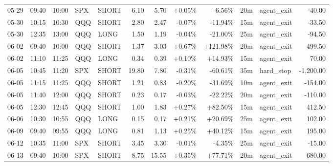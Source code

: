 \documentclass[11pt,a4paper]{article}
\begin{document}
\begin{center}
\begin{longtable}{>{\color{txtmain}}l l l l l r r r r r >{\color{txtmain}}l r}
05-29 & 09:40 & 10:00 & SPX & SHORT & 6.10 & 5.70 & \textcolor{wingreen}{+0.05\%} & \textcolor{lossred}{-6.56\%} & 20m & agent\_exit & \textcolor{lossred}{-40.00} \\
05-30 & 10:15 & 10:30 & QQQ & SHORT & 2.80 & 2.47 & \textcolor{lossred}{-0.07\%} & \textcolor{lossred}{-11.94\%} & 15m & agent\_exit & \textcolor{lossred}{-33.50} \\
05-30 & 12:35 & 13:00 & QQQ & LONG & 1.50 & 1.19 & \textcolor{lossred}{-0.04\%} & \textcolor{lossred}{-21.00\%} & 25m & agent\_exit & \textcolor{lossred}{-94.50} \\
06-02 & 09:40 & 10:00 & QQQ & SHORT & 1.37 & 3.03 & \textcolor{wingreen}{+0.67\%} & \textcolor{wingreen}{+121.98\%} & 20m & agent\_exit & \textcolor{wingreen}{499.50} \\
06-02 & 11:10 & 11:25 & QQQ & LONG & 0.34 & 0.39 & \textcolor{wingreen}{+0.10\%} & \textcolor{wingreen}{+14.93\%} & 15m & agent\_exit & \textcolor{wingreen}{70.00} \\
06-05 & 10:45 & 11:20 & SPX & SHORT & 19.80 & 7.80 & \textcolor{lossred}{-0.31\%} & \textcolor{lossred}{-60.61\%} & 35m & hard\_stop & \textcolor{lossred}{-1,200.00} \\
06-05 & 11:15 & 11:25 & QQQ & SHORT & 1.21 & 0.83 & \textcolor{lossred}{-0.20\%} & \textcolor{lossred}{-31.69\%} & 10m & agent\_exit & \textcolor{lossred}{-154.00} \\
06-05 & 11:40 & 12:00 & QQQ & SHORT & 0.23 & 0.17 & \textcolor{lossred}{-0.03\%} & \textcolor{lossred}{-22.22\%} & 20m & agent\_exit & \textcolor{lossred}{-110.00} \\
06-05 & 12:30 & 12:45 & QQQ & SHORT & 1.00 & 1.83 & \textcolor{wingreen}{+0.27\%} & \textcolor{wingreen}{+82.50\%} & 15m & agent\_exit & \textcolor{wingreen}{412.50} \\
06-06 & 10:30 & 10:55 & QQQ & LONG & 0.15 & 0.17 & \textcolor{wingreen}{+0.21\%} & \textcolor{wingreen}{+20.69\%} & 25m & agent\_exit & \textcolor{wingreen}{102.00} \\
06-09 & 09:40 & 09:55 & QQQ & LONG & 0.81 & 1.13 & \textcolor{wingreen}{+0.25\%} & \textcolor{wingreen}{+40.12\%} & 15m & agent\_exit & \textcolor{wingreen}{195.00} \\
06-12 & 10:35 & 11:00 & SPX & SHORT & 3.45 & 3.30 & \textcolor{lossred}{-0.01\%} & \textcolor{lossred}{-4.35\%} & 25m & agent\_exit & \textcolor{lossred}{-15.00} \\
06-13 & 09:40 & 10:00 & SPX & SHORT & 8.75 & 15.55 & \textcolor{wingreen}{+0.35\%} & \textcolor{wingreen}{+77.71\%} & 20m & agent\_exit & \textcolor{wingreen}{680.00} \\

\end{longtable}
\end{center}
\end{document}
